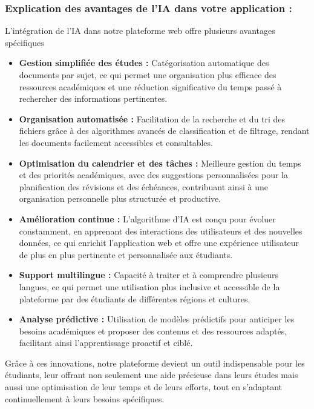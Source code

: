 \subsubsection{Explication des avantages de l'IA dans votre application : }
L'intégration de l'IA dans notre plateforme web offre plusieurs avantages spécifiques 
\vspace{4mm}
\begin{itemize}[label=$\bullet$]
\item \textbf{Gestion simplifiée des études :} Catégorisation automatique des documents par sujet, ce qui permet une organisation plus efficace des ressources académiques et une réduction significative du temps passé à rechercher des informations pertinentes.
\vspace{3mm}
\item \textbf{Organisation automatisée :} Facilitation de la recherche et du tri des fichiers grâce à des algorithmes avancés de classification et de filtrage, rendant les documents facilement accessibles et consultables.
\vspace{4mm}
\item \textbf{Optimisation du calendrier et des tâches :} Meilleure gestion du temps et des priorités académiques, avec des suggestions personnalisées pour la planification des révisions et des échéances, contribuant ainsi à une organisation personnelle plus structurée et productive.
\vspace{4mm}
\item \textbf{Amélioration continue : } L’algorithme d’IA est conçu pour évoluer constamment, en apprenant des interactions des utilisateurs et des nouvelles données, ce qui enrichit l’application web et offre une expérience utilisateur de plus en plus pertinente et personnalisée aux étudiants.
\vspace{4mm}
\item \textbf{Support multilingue :} Capacité à traiter et à comprendre plusieurs langues, ce qui permet une utilisation plus inclusive et accessible de la plateforme par des étudiants de différentes régions et cultures.
\vspace{4mm}
\item \textbf{Analyse prédictive :} Utilisation de modèles prédictifs pour anticiper les besoins académiques et proposer des contenus et des ressources adaptés, facilitant ainsi l'apprentissage proactif et ciblé.
\end{itemize}
\vspace{8mm}

Grâce à ces innovations, notre plateforme devient un outil indispensable pour les étudiants, leur offrant non seulement une aide précieuse dans leurs études mais aussi une optimisation de leur temps et de leurs efforts, tout en s’adaptant continuellement à leurs besoins spécifiques.
\newpage

